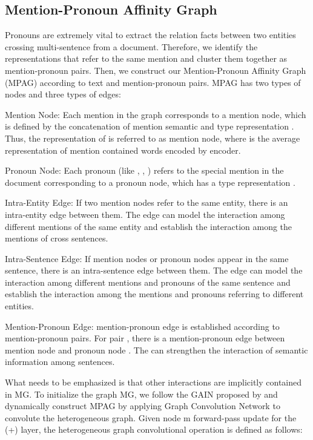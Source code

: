 \documentclass{article}
\begin{document}
\subsection{Mention-Pronoun Affinity Graph}

Pronouns are extremely vital to extract the relation facts between two entities crossing multi-sentence from a document. Therefore, we identify the representations that refer to the same mention and cluster them together as mention-pronoun pairs. Then, we construct our Mention-Pronoun Affinity Graph (MPAG) according to text and mention-pronoun pairs. MPAG has two types of nodes and three types of edges: 

Mention Node: Each mention in the graph corresponds to a mention node, which is defined by the concatenation of mention semantic and type representation . Thus, the representation of  is referred to as mention node, where  is the average representation of mention contained words encoded by encoder.

Pronoun Node: Each pronoun (like , , ) refers to the special mention in the document corresponding to a pronoun node, which has a type representation .

Intra-Entity Edge:  If two mention nodes refer to the same entity, there is an intra-entity edge between them. The edge can model the interaction among different mentions of the same entity and establish the interaction among the mentions of cross sentences.

Intra-Sentence Edge: If mention nodes or pronoun nodes appear in the same sentence, there is an intra-sentence edge between them. The edge can model the interaction among different mentions and pronouns of the same sentence and establish the interaction among the mentions and pronouns referring to different entities.

Mention-Pronoun Edge: mention-pronoun edge is established according to mention-pronoun pairs. For pair , there is a mention-pronoun edge between mention node  and pronoun node . The can strengthen the interaction of semantic information among sentences.

What needs to be emphasized is that other interactions are implicitly contained in MG. 
To initialize the graph MG, we follow the GAIN proposed by \cite{zeng2020double} and dynamically construct MPAG by applying Graph Convolution Network \cite{kipf2017semi} to convolute the heterogeneous graph. Given node m forward-pass update for the (+) layer, the heterogeneous graph convolutional operation is defined as follows:
 
\end{document}
